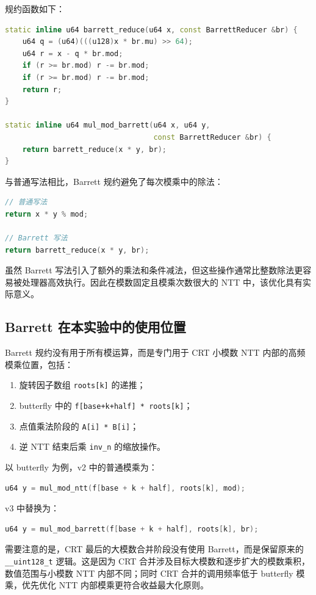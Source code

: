 \documentclass[a4paper]{article}
\begin{document}
规约函数如下：
\begin{lstlisting}[language=C++,title=Barrett 规约函数]
static inline u64 barrett_reduce(u64 x, const BarrettReducer &br) {
    u64 q = (u64)(((u128)x * br.mu) >> 64);
    u64 r = x - q * br.mod;
    if (r >= br.mod) r -= br.mod;
    if (r >= br.mod) r -= br.mod;
    return r;
}

static inline u64 mul_mod_barrett(u64 x, u64 y,
                                  const BarrettReducer &br) {
    return barrett_reduce(x * y, br);
}
\end{lstlisting}

与普通写法相比，Barrett 规约避免了每次模乘中的除法：
\begin{lstlisting}[language=C++]
// 普通写法
return x * y % mod;

// Barrett 写法
return barrett_reduce(x * y, br);
\end{lstlisting}

虽然 Barrett 写法引入了额外的乘法和条件减法，但这些操作通常比整数除法更容易被处理器高效执行。因此在模数固定且模乘次数很大的 NTT 中，该优化具有实际意义。

\subsection{Barrett 在本实验中的使用位置}

Barrett 规约没有用于所有模运算，而是专门用于 CRT 小模数 NTT 内部的高频模乘位置，包括：
\begin{enumerate}
    \item 旋转因子数组 \texttt{roots[k]} 的递推；
    \item butterfly 中的 \texttt{f[base+k+half] * roots[k]}；
    \item 点值乘法阶段的 \texttt{A[i] * B[i]}；
    \item 逆 NTT 结束后乘 \texttt{inv\_n} 的缩放操作。
\end{enumerate}

以 butterfly 为例，v2 中的普通模乘为：
\begin{lstlisting}[language=C++]
u64 y = mul_mod_ntt(f[base + k + half], roots[k], mod);
\end{lstlisting}
v3 中替换为：
\begin{lstlisting}[language=C++]
u64 y = mul_mod_barrett(f[base + k + half], roots[k], br);
\end{lstlisting}

需要注意的是，CRT 最后的大模数合并阶段没有使用 Barrett，而是保留原来的 \texttt{\_\_uint128\_t} 逻辑。这是因为 CRT 合并涉及目标大模数和逐步扩大的模数乘积，数值范围与小模数 NTT 内部不同；同时 CRT 合并的调用频率低于 butterfly 模乘，优先优化 NTT 内部模乘更符合收益最大化原则。
\end{document}
